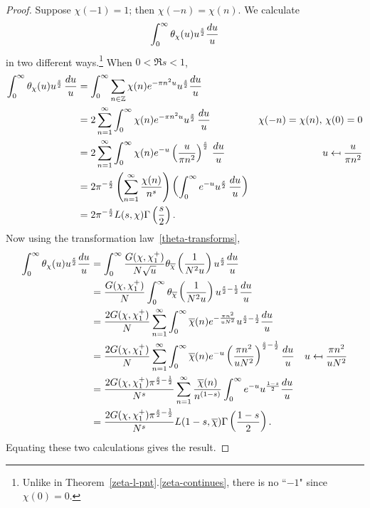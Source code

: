 \begin{proof}
 Suppose $\chi(-1)=1$; then $\chi(-n)=\chi(n)$. We calculate
\[
\int_0^{\infty} \theta_{\chi}(u) u^{\frac s2}\frac{du}{u}
\]
in two different ways.\footnote{Unlike in Theorem~\ref{zeta-l-pnt}.\ref{zeta-continues}, there is no ``$-1$" since $\chi(0)=0$.} When $0<\Re s<1$,
\begin{align*}
\int_0^{\infty} \theta_{\chi}(u)u^{\frac s2} \,\frac{du}u
&=\int_0^{\infty} \sum_{n\in\mathbb{Z}} \chi(n) e^{-\pi n^2u}u^{\frac s2}\frac{du}u\\
&=2\sum_{n=1}^{\infty} \int_0^{\infty} \chi(n) e^{-\pi n^2u}u^{\frac{s}2}\,\frac{du}u&\chi(-n)=\chi(n),\,\chi(0)=0\\
&=2\sum_{n=1}^{\infty} \int_0^{\infty} \chi(n)e^{-u} \left( {\frac{u}{\pi n^2}} \right)^{\frac s2}\,\frac{du}u&u\mapsfrom \frac{u}{\pi n^2}\\
&=2\pi^{-\frac s2}\left( {\sum_{n=1}^{\infty} \frac{\chi(n)}{n^s}} \right)\left( {\int_0^{\infty} e^{-u} u^{\frac s2}\,\frac{du}u} \right)\\
&=2\pi^{-\frac s2} L(s,\chi)\Gamma\left( {\frac{s}{2}} \right).
\end{align*}
Now using the transformation law~\ref{theta-transforms},
\begin{align*}
\int_0^{\infty} \theta_{\chi}(u) u^{\frac s2}\frac{du}{u}
&=\int_0^{\infty} \frac{G(\chi,\chi^+_1)}{N\sqrt u} \theta_{\overline{\chi}} \left( {\frac{1}{N^2u}} \right) u^{\frac s2}\frac{du}u\\
&=\frac{G(\chi,\chi^+_1)}N \int_0^{\infty} \theta_{\overline{\chi}} \left( {\frac{1}{N^2u}} \right) u^{\frac s2-\frac{1}{2}}\frac{du}u\\
&=\frac{2G(\chi,\chi^+_1)}N \sum_{n=1}^{\infty}\int_0^{\infty} \overline{\chi}(n) e^{-\frac{\pi n^2}{uN^2}} u^{\frac s2-\frac{1}{2}}\frac{du}u\\
&=\frac{2G(\chi,\chi^+_1)}N \sum_{n=1}^{\infty}\int_0^{\infty} \overline{\chi}(n) e^{-u} \left( {\frac{\pi n^2}{uN^2}} \right)^{\frac s2-\frac{1}{2}}\frac{du}u&u\mapsfrom \frac{\pi n^2}{uN^2}\\
&=\frac{2G(\chi,\chi^+_1)\pi^{\frac s2-\frac{1}{2}}}{N^s} \sum_{n=1}^{\infty} \frac{\overline{\chi}(n)}{n^{(1-s)}}\int_0^{\infty}e^{-u} u^{\frac{1-s}{2}}\frac{du}{u}\\
&=\frac{2G(\chi,\chi^+_1)\pi^{\frac s2-\frac{1}{2}}}{N^s} L(1-s,\overline{\chi}) \Gamma\left( {\frac{1-s}{2}} \right).
\end{align*}
Equating these two calculations gives the result.


\end{proof}
